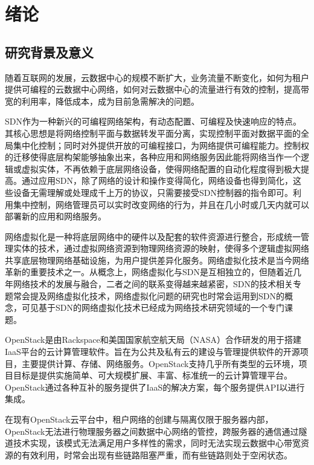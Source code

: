 
\chapter{绪论}
\section{研究背景及意义}
随着互联网的发展，云数据中心的规模不断扩大，业务流量不断变化，如何为租户提供可编程的云数据中心网络，如何对云数据中心的流量进行有效的控制，提高带宽的利用率，降低成本，成为目前急需解决的问题。

\gls*{SDN}作为一种新兴的可编程网络架构\cite{SDN-0}，有动态配置、可编程及快速响应的特点。其核心思想是将网络控制平面与数据转发平面分离，实现控制平面对数据平面的全局集中化控制；同时对外提供开放的可编程接口，为网络提供可编程能力。控制权的迁移使得底层构架能够抽象出来，各种应用和网络服务因此能将网络当作一个逻辑或虚拟实体，不再依赖于底层网络设备\cite{SDN-1}，使得网络配置的自动化程度得到极大提高。通过应用SDN，除了网络的设计和操作变得简化，网络设备也得到简化，这些设备无需理解或处理成千上万的协议，只需要接受SDN控制器的指令即可。利用集中控制，网络管理员可以实时改变网络的行为，并且在几小时或几天内就可以部署新的应用和网络服务。

网络虚拟化\cite{Virtual-1}是一种将底层网络中的硬件以及配套的软件资源进行整合，形成统一管理实体的技术，通过虚拟网络资源到物理网络资源的映射，使得多个逻辑虚拟网络共享底层物理网络基础设施，为用户提供差异化服务。网络虚拟化技术是当今网络革新的重要技术之一。从概念上，网络虚拟化与SDN是互相独立的，但随着近几年网络技术的发展与融合，二者之间的联系变得越来越紧密，SDN的技术相关专题常会提及网络虚拟化技术，网络虚拟化问题的研究也时常会运用到SDN的概念，可见基于SDN的网络虚拟化技术已经成为网络技术研究领域的一个专门课题\cite{Virtual-2}。

OpenStack\cite{OpenStack-1}是由Rackspace和美国国家航空航天局（NASA）合作研发的用于搭建\gls*{IaaS}平台的云计算管理软件。旨在为公共及私有云的建设与管理提供软件的开源项目，主要提供计算、存储、网络服务。OpenStack支持几乎所有类型的云环境，项目目标是提供实施简单、可大规模扩展、丰富、标准统一的云计算管理平台。OpenStack通过各种互补的服务提供了\gls*{IaaS}的解决方案，每个服务提供API以进行集成\cite{OpenStack-2}。

在现有OpenStack云平台中，租户网络的创建与隔离仅限于服务器内部，OpenStack无法进行物理服务器之间数据中心网络的管控，跨服务器的通信通过隧道技术实现，该模式无法满足用户多样性的需求，同时无法实现云数据中心带宽资源的有效利用，时常会出现有些链路阻塞严重，而有些链路则处于空闲状态。

